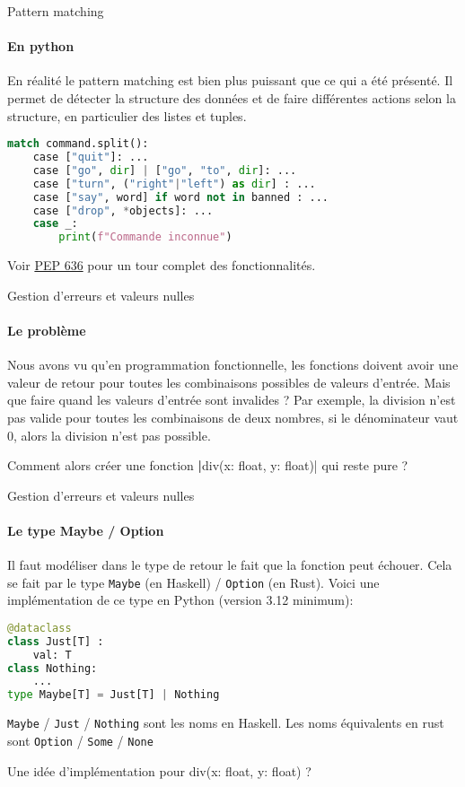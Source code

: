 \documentclass[aspectratio=169]{beamer}
\begin{document}
\begin{frame}[fragile]{Pattern matching}
    \framesubtitle{En python}

    En réalité le pattern matching est bien plus puissant que ce qui a été présenté. Il permet de détecter la structure des données et de faire différentes actions selon la structure, en particulier des listes et tuples.

    \begin{lstlisting}[language=Python]
match command.split():
    case ["quit"]: ... 
    case ["go", dir] | ["go", "to", dir]: ...
    case ["turn", ("right"|"left") as dir] : ...
    case ["say", word] if word not in banned : ...
    case ["drop", *objects]: ...
    case _:
        print(f"Commande inconnue")
    \end{lstlisting}

    Voir \href{https://peps.python.org/pep-0636/}{PEP 636} pour un tour complet des fonctionnalités.
\end{frame}

\begin{frame}{Gestion d'erreurs et valeurs nulles}
    \framesubtitle{Le problème}
    Nous avons vu qu'en programmation fonctionnelle, les fonctions doivent avoir une valeur de retour pour toutes les combinaisons possibles de valeurs d'entrée. Mais que faire quand les valeurs d'entrée sont invalides ?
    Par exemple, la division n'est pas valide pour toutes les combinaisons de deux nombres, si le dénominateur vaut 0, alors la division n'est pas possible.

    Comment alors créer une fonction \textbf|div(x: float, y: float)| qui reste pure ?
\end{frame}

\begin{frame}[fragile]{Gestion d'erreurs et valeurs nulles}
    \framesubtitle{Le type Maybe / Option}
    Il faut modéliser dans le type de retour le fait que la fonction peut échouer. Cela se fait par le type \verb|Maybe| (en Haskell) / \verb|Option| (en Rust).
    Voici une implémentation de ce type en Python (version 3.12 minimum):
    \begin{lstlisting}[language=Python]
@dataclass
class Just[T] :
    val: T
class Nothing:
    ...
type Maybe[T] = Just[T] | Nothing
    \end{lstlisting}

    \verb|Maybe| / \verb|Just| / \verb|Nothing| sont les noms en Haskell. Les noms équivalents en rust sont \verb|Option| / \verb|Some| / \verb|None|

    Une idée d'implémentation pour div(x: float, y: float) ?
\end{frame}
\end{document}
